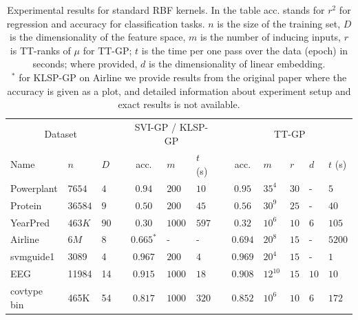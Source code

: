 \begin{table}[!t]
  \caption[]{Experimental results for standard RBF kernels. In the table acc. stands for $r^2$ for regression and accuracy
          for classification tasks. $n$ is the size of the
          training set, $D$ is the dimensionality of the feature space,
          $m$ is the number of inducing inputs, $r$ is TT-ranks of $\mu$ for TT-GP; $t$ is the time per one pass over
          the data (epoch) in seconds; where provided, $d$ is the dimensionality of linear embedding.\\
          $^*$ for KLSP-GP on Airline we provide results from the original
          paper where the accuracy is given as a plot, and detailed
          information about experiment setup and exact results is not available.
          }
  \label{se_results}
  \centering
  \begin{tabular}{lll l cll l cllll}
    \toprule
    \multicolumn{3}{c}{Dataset} && \multicolumn{3}{c}{SVI-GP / KLSP-GP} && \multicolumn{5}{c}{TT-GP} \\
    \cmidrule{1-3}
    \cmidrule{5-7}
    \cmidrule{9-13}

    Name & $n$ & $D$ &&
    acc. & $m$ & $t$ (s) &&
    acc. & $m$ & $r$ & $d$ & $t$ (s)\\
    \midrule

    Powerplant & $7654$ & $4$ &&
    $0.94$ & $200$ & $10$ &&
    $0.95$ & $35^4$ & $30$ & - & $5$ \\

    Protein & $36584$ & $9$ &&
    $0.50$ & $200$ & $45$ &&
    $0.56$ & $30^9$ & $25$ & - & $40$ \\

    YearPred & $463K$ & $90$ &&
    $0.30$ & $1000$ & $597$ &&
    $0.32$ & $10^6$ & $10$ & $6$ & $105$ \\

    \midrule
    Airline & $6M$ & $8$ &&
    $0.665^*$ & - & - &&
    $0.694$ & $20^8$ & $15$ & - & $5200$ \\

    svmguide1 & 3089 & 4 &&
    $0.967$ & $200$ & $4$ &&
    $0.969$ & $20^4$ & $15$ & - & $1$\\

    EEG & 11984 & 14 &&
    $0.915$ & $1000$ & $18$ &&
    $0.908$ & $12^{10}$ & $15$ & $10$ & $10$\\

    covtype bin & 465K & 54 &&
    $0.817$ & $1000$ & $320$ &&
    $0.852$ & $10^6$ & $10$ & $6$ & $172$\\
    \bottomrule
  \end{tabular}
\end{table}

